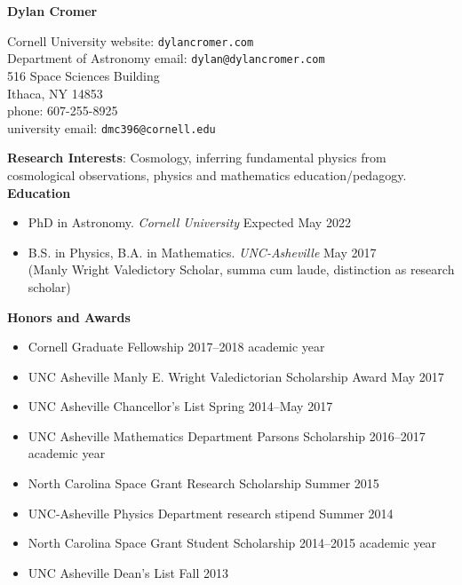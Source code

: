 \documentclass[letterpaper, 11pt]{article}
\title{}
\author{}
\date{Last Edited: \today}
\newcommand{\myrule}{\hrulefill}
\newcommand{\noi}{\noindent}
\begin{document}
\begin{center}
\textbf{Dylan Cromer} 
\\
\vspace{1.3em}
\myrule
\end{center}

\noi Cornell University \hfill website: \texttt{dylancromer.com}
\\
Department of Astronomy \hfill email: \texttt{dylan@dylancromer.com}
\\
516 Space Sciences Building \hfill
\\
Ithaca, NY 14853 \hfill
\\
phone: 607-255-8925 \hfill
\\
university email: \texttt{dmc396@cornell.edu} \hfill
\\

\fancyfoot{\myrule \\ Dylan Cromer \hfill \thepage}

\noi \textbf{Research Interests}: Cosmology, inferring fundamental physics from cosmological observations, physics and mathematics education/pedagogy.
\\

\noi \textbf{Education}
\begin{itemize}[leftmargin=*]

	\item PhD in Astronomy. \emph{Cornell University} \hfill Expected May 2022
	
	\item \noi B.S. in Physics, B.A. in Mathematics. \emph{UNC-Asheville} \hfill May 2017
		\\
	(Manly Wright Valedictory Scholar, summa cum laude, distinction as research scholar)

\end{itemize}

\noi \textbf{Honors and Awards}
\begin{itemize}[leftmargin=*]
	\item Cornell Graduate Fellowship \hfill 2017--2018 academic year

	\item UNC Asheville Manly E. Wright Valedictorian Scholarship Award \hfill May 2017

	\item UNC Asheville Chancellor's List \hfill Spring 2014--May 2017

	\item UNC Asheville Mathematics Department Parsons Scholarship \hfill 2016--2017 academic year

	\item North Carolina Space Grant Research Scholarship \hfill Summer 2015 

	\item UNC-Asheville Physics Department research stipend \hfill Summer 2014

	\item North Carolina Space Grant Student Scholarship \hfill 2014--2015 academic year

	\item UNC Asheville Dean's List \hfill Fall 2013

\end{itemize}
\end{document}
